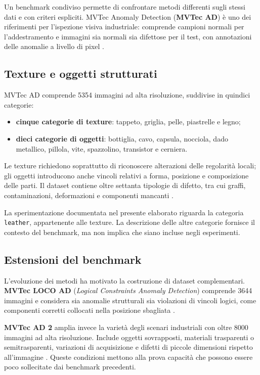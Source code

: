Un benchmark condiviso permette di confrontare metodi differenti sugli stessi dati e con criteri espliciti. MVTec Anomaly Detection (\textbf{MVTec AD}) è uno dei riferimenti per l'ispezione visiva industriale: comprende campioni normali per l'addestramento e immagini sia normali sia difettose per il test, con annotazioni delle anomalie a livello di pixel \cite{Bergmann_et_al._2019}.

\subsection{Texture e oggetti strutturati}

MVTec AD comprende 5354 immagini ad alta risoluzione, suddivise in quindici categorie:
\begin{itemize}
    \item \textbf{cinque categorie di texture}: tappeto, griglia, pelle, piastrelle e legno;
    \item \textbf{dieci categorie di oggetti}: bottiglia, cavo, capsula, nocciola, dado metallico, pillola, vite, spazzolino, transistor e cerniera.
\end{itemize}

Le texture richiedono soprattutto di riconoscere alterazioni delle regolarità locali; gli oggetti introducono anche vincoli relativi a forma, posizione e composizione delle parti. Il dataset contiene oltre settanta tipologie di difetto, tra cui graffi, contaminazioni, deformazioni e componenti mancanti \cite{Bergmann_et_al._2019}.

La sperimentazione documentata nel presente elaborato riguarda la categoria \texttt{leather}, appartenente alle texture. La descrizione delle altre categorie fornisce il contesto del benchmark, ma non implica che siano incluse negli esperimenti.

\subsection{Estensioni del benchmark}

L'evoluzione dei metodi ha motivato la costruzione di dataset complementari. \textbf{MVTec LOCO AD} (\textit{Logical Constraints Anomaly Detection}) comprende 3644 immagini e considera sia anomalie strutturali sia violazioni di vincoli logici, come componenti corretti collocati nella posizione sbagliata \cite{MVTech_LOCO_AD}.

\textbf{MVTec AD 2} amplia invece la varietà degli scenari industriali con oltre 8000 immagini ad alta risoluzione. Include oggetti sovrapposti, materiali trasparenti o semitrasparenti, variazioni di acquisizione e difetti di piccole dimensioni rispetto all'immagine \cite{Steger_et_al._2026}. Queste condizioni mettono alla prova capacità che possono essere poco sollecitate dai benchmark precedenti.

